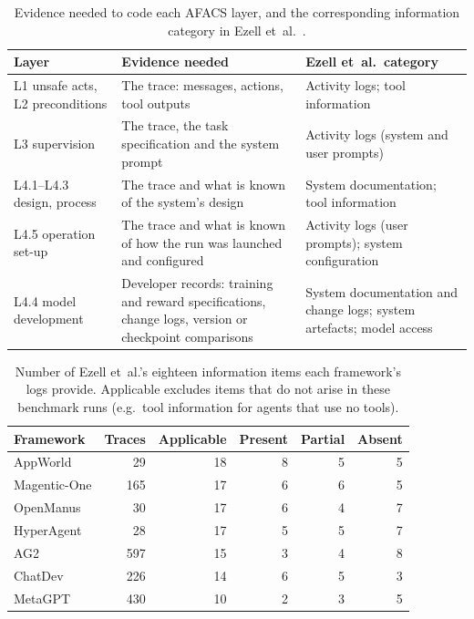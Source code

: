 \documentclass[11pt]{article}
\begin{document}
\begin{table}[tbp]
\centering
\caption{Evidence needed to code each AFACS layer, and the corresponding
information category in Ezell et~al.~\cite{ezell2025incident}.}
\label{tab:evsource}
\small
\begin{tabular}{@{}L{3.4cm}L{6.2cm}L{4.6cm}@{}}
\toprule
Layer & Evidence needed & Ezell et~al.\ category\\
\midrule
L1 unsafe acts, L2 preconditions & The trace: messages, actions, tool outputs & Activity logs; tool information\\
L3 supervision & The trace, the task specification and the system prompt & Activity logs (system and user prompts)\\
L4.1--L4.3 design, process & The trace and what is known of the system's design & System documentation; tool information\\
L4.5 operation set-up & The trace and what is known of how the run was launched and configured & Activity logs (user prompts); system configuration\\
L4.4 model development & Developer records: training and reward specifications, change logs, version or checkpoint comparisons & System documentation and change logs; system artefacts; model access\\
\bottomrule
\end{tabular}
\end{table}

\begin{table}[tbp]
\centering
\caption{Number of Ezell et~al.'s eighteen information items each framework's
logs provide. Applicable excludes items that do not arise in these benchmark
runs (e.g.\ tool information for agents that use no tools).}
\label{tab:info}
\small
\begin{tabular}{@{}lrrrrr@{}}
\toprule
Framework & Traces & Applicable & Present & Partial & Absent\\
\midrule
AppWorld & 29 & 18 & 8 & 5 & 5\\
Magentic-One & 165 & 17 & 6 & 6 & 5\\
OpenManus & 30 & 17 & 6 & 4 & 7\\
HyperAgent & 28 & 17 & 5 & 5 & 7\\
AG2 & 597 & 15 & 3 & 4 & 8\\
ChatDev & 226 & 14 & 6 & 5 & 3\\
MetaGPT & 430 & 10 & 2 & 3 & 5\\
\bottomrule
\end{tabular}
\end{table}
\end{document}
